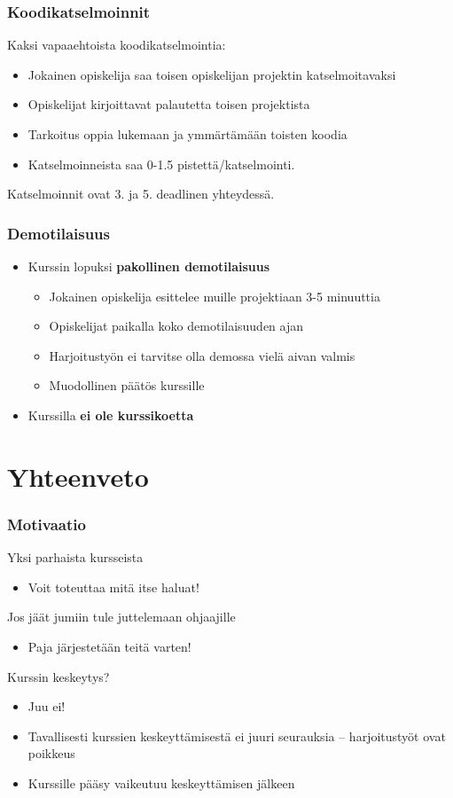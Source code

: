 \documentclass[finnish]{beamer}
\begin{document}
	\begin{frame}
		\frametitle{Koodikatselmoinnit}
		
		Kaksi vapaaehtoista koodikatselmointia:
		\begin{itemize}
			\item Jokainen opiskelija saa toisen opiskelijan projektin katselmoitavaksi
			\item Opiskelijat kirjoittavat palautetta toisen projektista
			\item Tarkoitus oppia lukemaan ja ymmärtämään toisten koodia
			\item Katselmoinneista saa 0-1.5 pistettä/katselmointi.
		\end{itemize}
		Katselmoinnit ovat 3. ja 5. deadlinen yhteydessä.
	\end{frame}
	
	\begin{frame}
		\frametitle{Demotilaisuus}
		\begin{itemize}
			\item Kurssin lopuksi \textbf{pakollinen demotilaisuus}
			\begin{itemize}
				\item Jokainen opiskelija esittelee muille projektiaan 3-5 minuuttia
				\item Opiskelijat paikalla koko demotilaisuuden ajan
				\item Harjoitustyön ei tarvitse olla demossa vielä aivan valmis
				\item Muodollinen päätös kurssille
			\end{itemize}
			\item Kurssilla \textbf{ei ole kurssikoetta}
		\end{itemize}
	\end{frame}
	
	\section{Yhteenveto}
	
	\begin{frame}
		\frametitle{Motivaatio}

		Yksi parhaista kursseista
		\begin{itemize}
			\item Voit toteuttaa mitä itse haluat!
		\end{itemize}		
		
		Jos jäät jumiin tule juttelemaan ohjaajille
		\begin{itemize}
			\item Paja järjestetään teitä varten!
		\end{itemize}
		
		Kurssin keskeytys?
		\begin{itemize}
			\item Juu ei!
			\item Tavallisesti kurssien keskeyttämisestä ei juuri seurauksia -- harjoitustyöt ovat poikkeus
			\item Kurssille pääsy vaikeutuu keskeyttämisen jälkeen
		\end{itemize}
	\end{frame}
	
\end{document}
